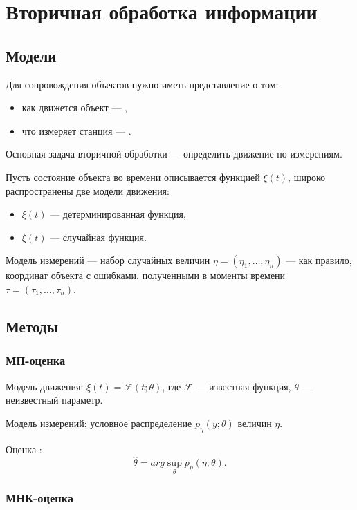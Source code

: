 \section{Вторичная обработка информации}

\subsection{Модели}

Для сопровождения объектов нужно иметь представление о том:
\begin{itemize}
    \item как движется объект --- ,
    \item что измеряет станция --- .
\end{itemize}

Основная задача вторичной обработки --- определить движение по измерениям.

Пусть состояние объекта во времени описывается функцией $\xi(t)$, широко распространены две модели движения:
\begin{itemize}
    \item $\xi(t)$ --- детерминированная функция,
    \item $\xi(t)$ --- случайная функция.
\end{itemize}

Модель измерений --- набор случайных величин $\eta = (\eta_1, \dots, \eta_n)$ --- как правило, координат объекта с ошибками, полученными
в моменты времени $\tau = (\tau_1, \dots, \tau_n)$.

\subsection{Методы}

\subsubsection{МП-оценка}

Модель движения: $\xi(t) = \mathcal{F}(t; \theta)$, где $\mathcal{F}$ --- известная функция, $\theta$ --- неизвестный параметр.

Модель измерений: условное распределение $p_\eta(y; \theta)$ величин $\eta$.

Оценка :
\[
    \widehat{\theta} = arg \sup \limits_\theta p_\eta(\eta; \theta) .
\]

\subsubsection{МНК-оценка}

